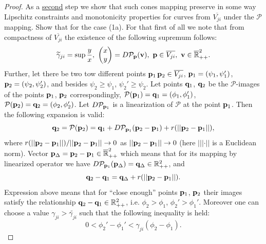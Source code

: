 \begin{proof}
	As a \underline{second} step we show that such cones mapping preserve in some way Lipschitz constraints and monotonicity properties for curves from $\overline{V_{ji}}$ under the $\mathcal{P}$ mapping.
	Show that for the case (1a).
	For that first of all we note that from compactness of $\overline{V_{ji}}$ the existence of the following supremum follows:
	\begin{equation*}
		\widetilde{\gamma}_{ji} = \sup \dfrac{y}{x}, \ \begin{pmatrix} x \\ y \end{pmatrix} = D \mathcal{P}_{\vb{p}} (\mathbf{v}), \ \vb{p} \in \overline{V_{ji}}, \ \mathbf{v} \in \overline{\mathbb{R}}_{++}^2.
	\end{equation*}
	Further, let there be two tow different points $\vb{p}_1 \, \vb{p}_2 \in \overline{V_{ji}}$, $\vb{p}_1 = (\psi_1, \psi_1')$, $\vb{p}_2 = (\psi_2, \psi_2')$, and besides $\psi_2 \ge \psi_1$, $\psi_2' \ge \psi_2$.
	Let points $\vb{q}_1$, $\vb{q}_2$ be the $\mathcal{P}$-images of the points $\vb{p}_1$, $\vb{p}_2$ correspondingly, $\mathcal{P}(\vb{p}_1) = \vb{q}_1 = (\phi_1, \phi_1')$, $\mathcal{P}(\vb{p}_2) = \vb{q}_2 = (\phi_2, \phi_2')$.
	Let $D \mathcal{P}_{\vb{p}_1}$ is a linearization of $\mathcal{P}$ at the point $\vb{p}_1$.
	Then the following expansion is valid:
	\begin{equation}
		\vb{q}_2 = \mathcal{P}(\vb{p}_2) = \vb{q}_1 + D \mathcal{P}_{\vb{p}_1} (\vb{p}_2 - \vb{p}_1) + r(||\vb{p}_2 - \vb{p}_1||),
	\end{equation}
	where $r(||\vb{p}_2 - \vb{p}_1||) / ||\vb{p}_2 - \vb{p}_1|| \to 0$ as $||\vb{p}_2 - \vb{p}_1|| \to 0$ (here $|||\cdot||$ is a Euclidean norm).
	Vector $\vb{p}_{\Delta} = \vb{p}_2 - \vb{p}_1 \in \overline{\mathbb{R}}_{++}^2$ which means that for its mapping by linearized operator we have $D \mathcal{P}_{\vb{p}_1} (\mathbf{p}_{\Delta}) = \mathbf{q}_{\Delta} \in \mathbb{R}_{++}^2$, and
	\begin{equation}
		\vb{q}_2 - \vb{q}_1 = \mathbf{q}_{\Delta} + r(||\vb{p}_2 - \vb{p}_1||).
	\end{equation}
	Expression above means that for ``close enough'' points $\vb{p}_1$, $\vb{p}_2$ their images satisfy the relationship $\vb{q}_2 - \vb{q}_1 \in \mathbb{R}_{++}^2$, i.e. $\phi_2 > \phi_1$, $\phi_2' > \phi_1'$.
	Moreover one can choose a value $\gamma_{ji} > \widetilde{\gamma_{ji}}$ such that the following inequality is held:
	\begin{equation}
		0 < \phi_2' - \phi_1' < \gamma_{ji} (\phi_2 - \phi_1).

\end{equation}
\end{proof}
